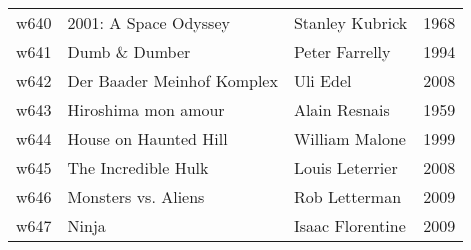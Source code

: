 \documentclass{article}
\begin{document}
\begin {center}
\begin{longtable}{l p{10cm} l l}
w640 & 2001: A Space Odyssey & Stanley Kubrick & 1968 \\
w641 & Dumb \& Dumber & Peter Farrelly & 1994 \\
w642 & Der Baader Meinhof Komplex & Uli Edel & 2008 \\
w643 & Hiroshima mon amour & Alain Resnais & 1959 \\
w644 & House on Haunted Hill & William Malone & 1999 \\
w645 & The Incredible Hulk & Louis Leterrier & 2008 \\
w646 & Monsters vs. Aliens & Rob Letterman & 2009 \\
w647 & Ninja & Isaac Florentine & 2009 \\
\hline
\end{longtable}
\end{center}
\end{document}
